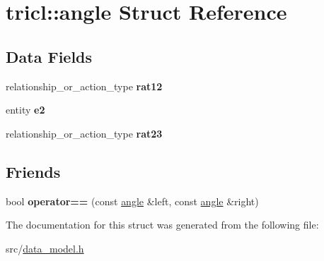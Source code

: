 \hypertarget{structtricl_1_1angle}{}\section{tricl\+:\+:angle Struct Reference}
\label{structtricl_1_1angle}
\subsection*{Data Fields}
\begin{DoxyCompactItemize}
\item 
\mbox{\label{structtricl_1_1angle_af850c72e4b4b69131e171984213e306d}} 
relationship\+\_\+or\+\_\+action\+\_\+type {\bfseries rat12}
\item 
\mbox{\label{structtricl_1_1angle_ac03e3d590e5228ebf4a5137ec72a7219}} 
entity {\bfseries e2}
\item 
\mbox{\label{structtricl_1_1angle_af0ec7d54e4d93cbf5df891dcc8397453}} 
relationship\+\_\+or\+\_\+action\+\_\+type {\bfseries rat23}
\end{DoxyCompactItemize}
\subsection*{Friends}
\begin{DoxyCompactItemize}
\item 
\mbox{\label{structtricl_1_1angle_a08af3ce953cf2a9246fc60278c929a52}} 
bool {\bfseries operator==} (const \hyperlink{structtricl_1_1angle}{angle} \&left, const \hyperlink{structtricl_1_1angle}{angle} \&right)
\end{DoxyCompactItemize}


The documentation for this struct was generated from the following file\+:\begin{DoxyCompactItemize}
\item 
src/\hyperlink{data__model_8h}{data\+\_\+model.\+h}\end{DoxyCompactItemize}
